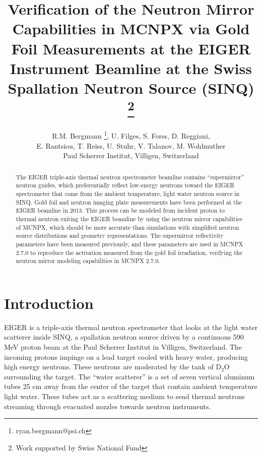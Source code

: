 \documentclass[a4paper,
              ]{jacow}
\begin{document}
\title{Verification of the Neutron Mirror Capabilities in MCNPX via Gold Foil Measurements at the EIGER Instrument Beamline at the Swiss Spallation Neutron Source (SINQ) \thanks{Work supported by Swiss National Fund}}

\author{R.M. Bergmann \thanks{ryan.bergmann@psi.ch}, U. Filges, S. Forss, D. Reggiani, \\ E. Rantsiou, T. Reiss, U. Stuhr, V. Talanov, M. Wohlmuther \\ Paul Scherrer Institut, Villigen, Switzerland\\}

\maketitle

%
\begin{abstract}
   The EIGER triple-axis thermal neutron spectrometer beamline contains “supermirror” neutron guides, which preferentially reflect low-energy neutrons toward the EIGER spectrometer that come from the ambient temperature, light water neutron source in SINQ.  Gold foil and neutron imaging plate measurements have been performed at the EIGER beamline in 2013.  This process can be modeled from incident proton to thermal neutron exiting the EIGER beamline by using the neutron mirror capabilities of MCNPX, which should be more accurate than simulations with simplified neutron source distributions and geometry representations.  The supermirror reflectivity parameters have been measured previously, and these parameters are used in MCNPX 2.7.0 to reproduce the activation measured from the gold foil irradiation, verifying the neutron mirror modeling capabilities in MCNPX 2.7.0.
\end{abstract}


\section{Introduction}

EIGER is a triple-axis thermal neutron spectrometer that looks at the light water scatterer inside SINQ, a spallation neutron source driven by a continuous 590 MeV proton beam at the Paul Scherrer Institut in Villigen, Switzerland.  The incoming protons impinge on a lead target cooled with heavy water, producing high energy neutrons.  These neutrons are moderated by the tank of D$_2$O surrounding the target.  The ``water scatterer'' is a set of seven vertical aluminum tubes 25 cm away from the center of the target that contain ambient temperature light water.  These tubes act as a scattering medium to send thermal neutrons streaming through evacuated nozzles towards neutron instruments.  
\end{document}
